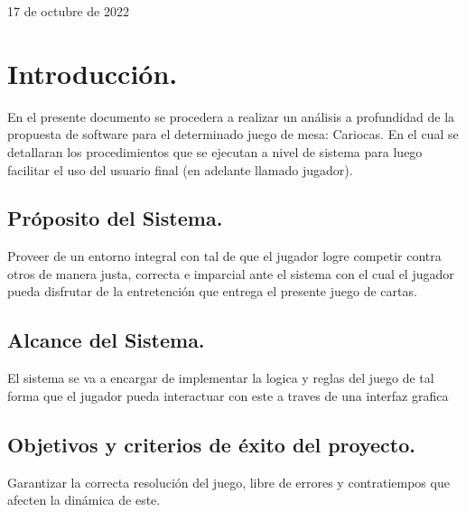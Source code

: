\documentclass[60pt]{article}
\newcommand{\Date}{17 de octubre de 2022}%
\begin{document}
\begin{center}
    \vspace*{\fill}
    \begin{center}
        {\large \Date}                                                                 %
    \end{center}
\end{center}

\newpage
\pagestyle{mypagestyle}
\tableofcontents

\newpage



\section{Introducción.}\label{cap:intro}

En el presente documento se procedera a realizar un análisis a profundidad de la propuesta de software para el determinado juego de mesa: Cariocas. En el cual se detallaran los procedimientos que se ejecutan a nivel de sistema para luego facilitar el uso del usuario final (en adelante llamado jugador).



\subsection{Próposito del Sistema.}\label{cap:proposito}
Proveer de un entorno integral con tal de que el jugador logre competir contra otros de manera justa, correcta e imparcial ante el sistema con el cual el jugador pueda disfrutar de la entretención que entrega el presente juego de cartas.

\subsection{Alcance del Sistema.}\label{cap:alcance}
El sistema se va a encargar de implementar la logica y reglas del juego de tal forma que el jugador pueda interactuar con este a traves de una interfaz grafica

\subsection{Objetivos y criterios de éxito del proyecto.}\label{cap:objetivos}
Garantizar la correcta resolución del juego, libre de errores y contratiempos que afecten la dinámica de este.
\end{document}
